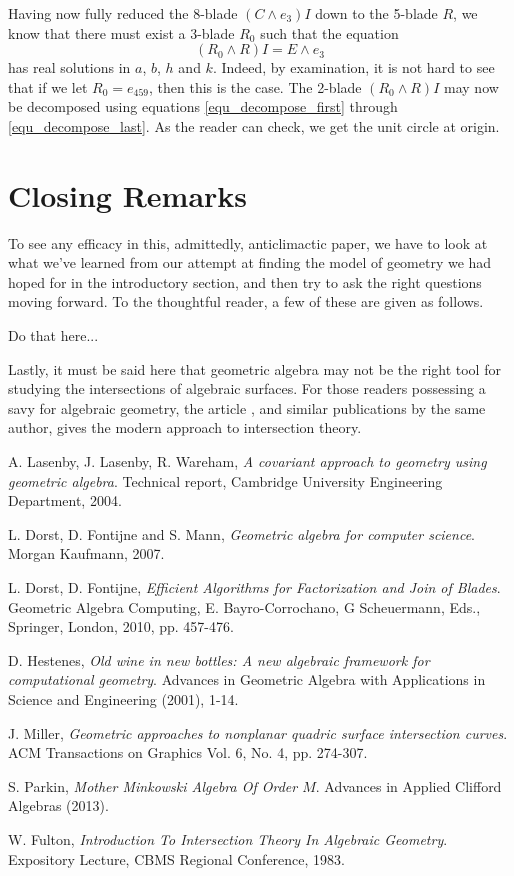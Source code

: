 \documentclass{birkjour}
\theoremstyle{definition}
\theoremstyle{remark}
\numberwithin{equation}{section}
\begin{document}
Having now fully reduced the 8-blade $(C\wedge e_3)I$ down to the 5-blade $R$, we know
that there must exist a 3-blade $R_0$ such that the equation
\begin{equation*}
(R_0\wedge R)I = E\wedge e_3
\end{equation*}
has real solutions in $a$, $b$, $h$ and $k$.
Indeed, by examination, it is not hard to see that if we let $R_0=e_{459}$, then this is the case.
The 2-blade $(R_0\wedge R)I$ may now be decomposed using equations \eqref{equ_decompose_first} through \eqref{equ_decompose_last}.
As the reader can check, we get the unit circle at origin.

\section{Closing Remarks}

To see any efficacy in this, admittedly, anticlimactic paper, we have to look at what
we've learned from our attempt at finding the model of geometry we had hoped
for in the introductory section, and then try to ask the right questions moving forward.
To the thoughtful reader, a few of these are given as follows.

Do that here...

Lastly, it must be said here that geometric algebra may not be the right tool
for studying the intersections of algebraic surfaces.  For those readers possessing a savy
for algebraic geometry, the article \cite{Fulton83}, and similar publications by the same author,
gives the modern approach to intersection theory.

\begin{thebibliography}{9}

A. Lasenby, J. Lasenby, R. Wareham, {\it A covariant approach
to geometry using geometric algebra}.  Technical report, Cambridge University
Engineering Department, 2004.

L. Dorst, D. Fontijne and S. Mann, {\it Geometric algebra for computer
science}. Morgan Kaufmann, 2007.

L. Dorst, D. Fontijne, {\it Efficient Algorithms for Factorization and Join
of Blades}.  Geometric Algebra Computing, E. Bayro-Corrochano, G Scheuermann, Eds.,
Springer, London, 2010, pp. 457-476.

D. Hestenes, {\it Old wine in new bottles: A new algebraic
framework for computational geometry}. Advances in Geometric
Algebra with Applications in Science and Engineering (2001), 1-14.

J. Miller, {\it Geometric approaches to nonplanar quadric surface
intersection curves}. ACM Transactions on Graphics Vol. 6, No. 4, pp.
274-307.

S. Parkin, {\it Mother Minkowski Algebra Of Order $M$}.
Advances in Applied Clifford Algebras (2013).

W. Fulton, {\it Introduction To Intersection Theory In Algebraic Geometry}.
Expository Lecture, CBMS Regional Conference, 1983.

\end{thebibliography}
\end{document}
